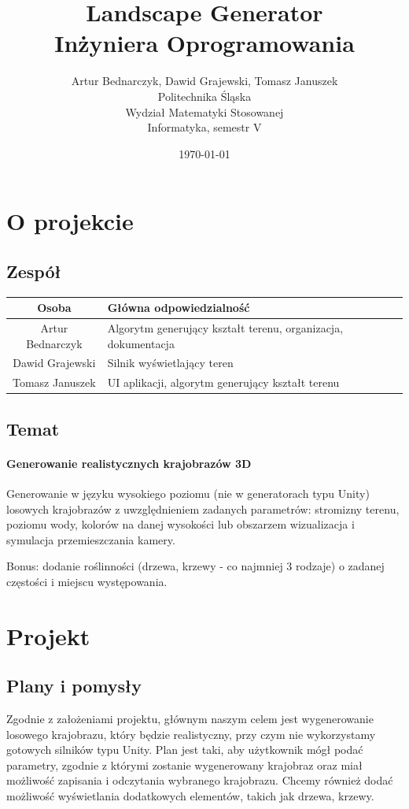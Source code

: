 \documentclass[12pt,a4paper]{article}
\title{Landscape Generator\\Inżyniera Oprogramowania}
\author{Artur Bednarczyk, Dawid Grajewski, Tomasz Januszek\\Politechnika Śląska\\Wydział Matematyki Stosowanej\\Informatyka, semestr V}
\date{\today}
\begin{document}
\maketitle
\newpage
\tableofcontents
\newpage
\section{O projekcie}
\subsection{Zespół}
\begin{tabular}{c|l}
Osoba & Główna odpowiedzialność \\
\hline
Artur Bednarczyk & Algorytm generujący kształt terenu, organizacja, dokumentacja \\
Dawid Grajewski & Silnik wyświetlający teren \\
Tomasz Januszek & UI aplikacji, algorytm generujący kształt terenu
\end{tabular}
\subsection{Temat}
\paragraph{Generowanie realistycznych krajobrazów 3D}
Generowanie w języku wysokiego poziomu (nie w generatorach typu Unity) losowych krajobrazów z uwzględnieniem zadanych parametrów: stromizny terenu, poziomu wody, kolorów na danej wysokości lub obszarzem wizualizacja i symulacja przemieszczania kamery.

Bonus: dodanie roślinności (drzewa, krzewy - co najmniej 3 rodzaje) o zadanej częstości i miejscu występowania.

\section{Projekt}
\subsection{Plany i pomysły}
Zgodnie z założeniami projektu, głównym naszym celem jest wygenerowanie losowego krajobrazu, który będzie realistyczny, przy czym nie wykorzystamy gotowych silników typu Unity. Plan jest taki, aby użytkownik mógł podać parametry, zgodnie z którymi zostanie wygenerowany krajobraz oraz miał możliwość zapisania i odczytania wybranego krajobrazu. Chcemy również dodać możliwość wyświetlania dodatkowych elementów, takich jak drzewa, krzewy.
\end{document}
